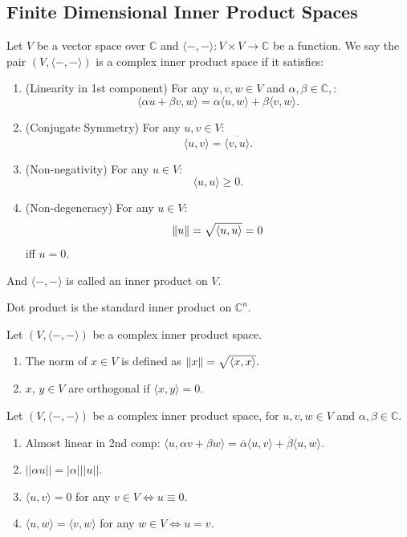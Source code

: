 \subsection{Finite Dimensional Inner Product Spaces}

\begin{definition}
    Let $V$ be a vector space over $\mathbb{C}$ and $\langle-,-\rangle: V\times V\to\mathbb{C}$ be a function.
    We say the pair $(V,\langle-,-\rangle)$ is a complex inner product space if it satisfies:
    \begin{enumerate}
        \item (Linearity in 1st component) For any $u,v,w\in V$ and $\alpha,\beta\in\mathbb{C},$:
        $$\langle\alpha u+\beta v,w\rangle = \alpha\langle u, w\rangle + \beta\langle v,w\rangle.$$
        \item (Conjugate Symmetry) For any $u,v\in V$:
        $$\langle u,v\rangle = \overline{\langle v,u\rangle}.$$
        \item (Non-negativity) For any $u\in V$:
        $$\langle u,u\rangle\ge 0.$$
        \item (Non-degeneracy) For any $u\in V$:
        $$\left\lVert u \right\rVert=\sqrt{\langle u,u\rangle}=0$$ 
        iff $u=0$.
    \end{enumerate}
    And $\langle-,-\rangle$ is called an inner product on $V$.
\end{definition}

\begin{remark}
Dot product is the standard inner product on $\mathbb{C}^n.$
\end{remark}

\begin{definition}
    Let $(V,\langle-,-\rangle)$ be a complex inner product space.
    \begin{enumerate}
        \item The norm of $x\in V$ is defined as $\left\lVert x \right\rVert=\sqrt{\langle x,x\rangle}.$
        \item $x,\,y\in V$ are orthogonal if $\langle x, y\rangle = 0.$
    \end{enumerate}
\end{definition}


\begin{theorem}
    Let $(V,\langle-,-\rangle)$ be a complex inner product space, for $u,v,w\in V$ and $\alpha,\beta\in\mathbb{C}$.
    \begin{enumerate}
        \item Almost linear in 2nd comp: $\langle u,\alpha v+\beta w\rangle=\overline{\alpha}\langle u,v\rangle+\overline{\beta}\langle u,w\rangle$.
        \item $||\alpha u||=|\alpha|||u||$.
        \item $\langle u,v\rangle=0$ for any $v\in V \Leftrightarrow u\equiv 0$.
        \item $\langle u,w\rangle=\langle v,w\rangle$ for any $w\in V \Leftrightarrow u=v$.
    \end{enumerate}
\end{theorem}

